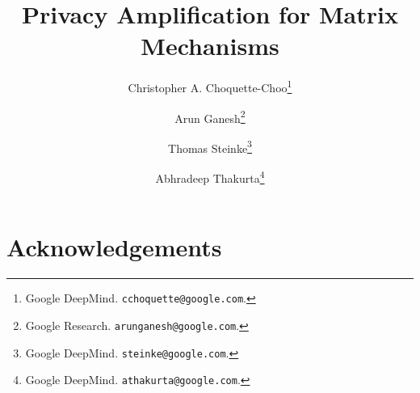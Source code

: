 \documentclass{article}
\begin{document}
\normalem  %

\title{Privacy Amplification for Matrix Mechanisms}
\author{Christopher A. Choquette-Choo\thanks{Google DeepMind.  \texttt{cchoquette@google.com}.} 
\and Arun Ganesh\thanks{Google Research.  \texttt{arunganesh@google.com}.} 
\and 
Thomas Steinke\thanks{Google DeepMind. \texttt{steinke@google.com}.} 
\and 
Abhradeep Thakurta\thanks{Google DeepMind. \texttt{athakurta@google.com}.} 
}
\maketitle

\begin{abstract}

\end{abstract}









\section*{Acknowledgements}





\appendix


\end{document}
